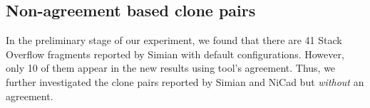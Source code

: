 \documentclass{sig-alternate-05-2015}
\begin{document}

\subsection{Non-agreement based clone pairs}
In the preliminary stage of our experiment, we found that there are 41 Stack Overflow fragments reported by Simian with default configurations. However, only 10 of them appear in the new results using tool's agreement. Thus, we further investigated the clone pairs reported by Simian and NiCad but \textit{without} an agreement. 
\end{document}
